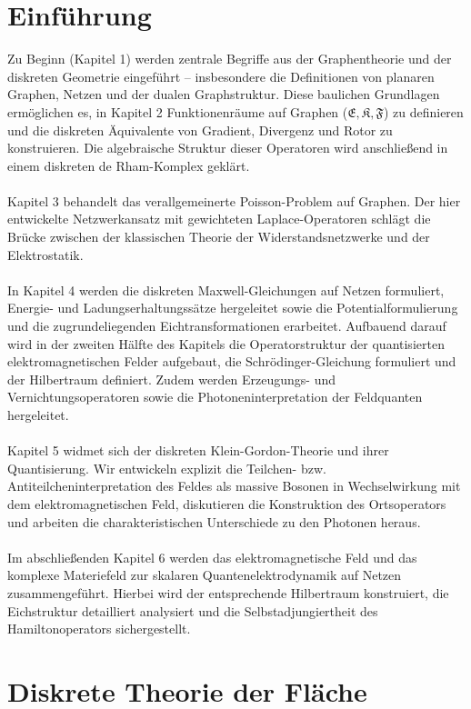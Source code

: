 \documentclass[11pt,a4paper,leqno]{report}
\numberwithin{equation}{chapter}
\begin{document}
\chapter*{Einführung}
Zu Beginn (Kapitel 1) werden zentrale Begriffe aus der Graphentheorie und der diskreten Geometrie eingeführt – insbesondere die Definitionen von planaren Graphen, Netzen und der dualen Graphstruktur. Diese baulichen Grundlagen ermöglichen es, in Kapitel 2 Funktionenräume auf Graphen ($\mathfrak{E}, \mathfrak{K}, \mathfrak{F}$) zu definieren und die diskreten Äquivalente von Gradient, Divergenz und Rotor zu konstruieren. Die algebraische Struktur dieser Operatoren wird anschließend in einem diskreten de Rham-Komplex geklärt.
\\
\\
Kapitel 3 behandelt das verallgemeinerte Poisson-Problem auf Graphen. Der hier entwickelte Netzwerkansatz mit gewichteten Laplace-Operatoren schlägt die Brücke zwischen der klassischen Theorie der Widerstandsnetzwerke und der Elektrostatik.
\\
\\
In Kapitel 4 werden die diskreten Maxwell-Gleichungen auf Netzen formuliert, Energie- und Ladungserhaltungssätze hergeleitet sowie die Potentialformulierung und die zugrundeliegenden Eichtransformationen erarbeitet. Aufbauend darauf wird in der zweiten Hälfte des Kapitels die Operatorstruktur der quantisierten elektromagnetischen Felder aufgebaut, die Schrödinger-Gleichung formuliert und der Hilbertraum definiert. Zudem werden Erzeugungs- und Vernichtungsoperatoren sowie die Photoneninterpretation der Feldquanten hergeleitet.
\\
\\
Kapitel 5 widmet sich der diskreten Klein-Gordon-Theorie und ihrer Quantisierung. Wir entwickeln explizit die Teilchen- bzw. Antiteilcheninterpretation des Feldes als massive Bosonen in Wechselwirkung mit dem elektromagnetischen Feld, diskutieren die Konstruktion des Ortsoperators und arbeiten die charakteristischen Unterschiede zu den Photonen heraus.
\\
\\
Im abschließenden Kapitel 6 werden das elektromagnetische Feld und das komplexe Materiefeld zur skalaren Quantenelektrodynamik auf Netzen zusammengeführt. Hierbei wird der entsprechende Hilbertraum konstruiert, die Eichstruktur detailliert analysiert und die Selbstadjungiertheit des Hamiltonoperators sichergestellt.

\chapter{Diskrete Theorie der Fläche}
\end{document}
